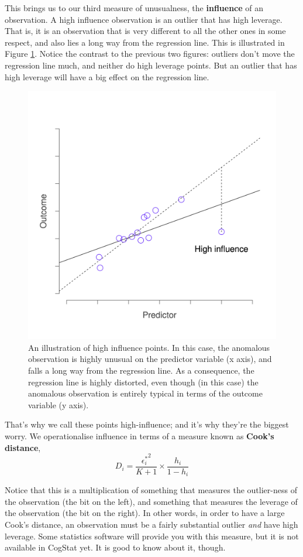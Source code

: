 \documentclass[
  11pt,
  a4paper,
  twoside,symmetric,openright]{book}
\theoremstyle{break}
\theoremstyle{break}
\begin{document}
This brings us to our third measure of unusualness, the \textbf{influence} of an observation. A high influence observation is an outlier that has high leverage. That is, it is an observation that is very different to all the other ones in some respect, and also lies a long way from the regression line. This is illustrated in Figure \ref{fig:influence}. Notice the contrast to the previous two figures: outliers don't move the regression line much, and neither do high leverage points. But an outlier that has high leverage will have a big effect on the regression line.

\begin{figure}

{\centering \includegraphics[width=0.6\linewidth]{resources/image/unusual_influence} 

}

\caption{An illustration of high influence points. In this case, the anomalous observation is highly unusual on the predictor variable (x axis), and falls a long way from the regression line. As a consequence, the regression line is highly distorted, even though (in this case) the anomalous observation is entirely typical in terms of the outcome variable (y axis).}\label{fig:influence}
\end{figure}

That's why we call these points high-influence; and it's why they're the biggest worry. We operationalise influence in terms of a measure known as \textbf{Cook's distance},
\[
D_i = \frac{{\epsilon_i^*}^2 }{K+1} \times \frac{h_i}{1-h_i}
\]

Notice that this is a multiplication of something that measures the outlier-ness of the observation (the bit on the left), and something that measures the leverage of the observation (the bit on the right). In other words, in order to have a large Cook's distance, an observation must be a fairly substantial outlier \emph{and} have high leverage. Some statistics software will provide you with this measure, but it is not available in CogStat yet. It is good to know about it, though.
\end{document}
